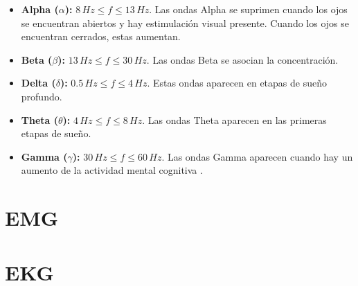 \begin{itemize}
 \item \textbf{Alpha ($\alpha$):} $ 8 \, Hz \leq f \leq 13 \, Hz$. Las ondas Alpha se suprimen cuando los ojos se encuentran abiertos y hay estimulación visual presente. Cuando los ojos se encuentran cerrados, estas aumentan.
 \item \textbf{Beta ($\beta$):} $ 13 \, Hz \leq f \leq 30 \, Hz$. Las ondas Beta se asocian la concentración.
 \item \textbf{Delta ($\delta$):} $ 0.5 \, Hz \leq f \leq 4 \, Hz$. Estas ondas aparecen en etapas de sueño profundo.
 \item \textbf{Theta ($\theta$):} $ 4 \, Hz \leq f \leq 8 \, Hz$. Las ondas Theta aparecen en las primeras etapas de sueño.
 \item \textbf{Gamma ($\gamma$):} $ 30 \, Hz \leq f \leq 60 \, Hz$. Las ondas Gamma aparecen cuando hay un aumento de la actividad mental cognitiva \cite{neural-eng}.
\end{itemize}

\section{EMG}

\section{EKG}
